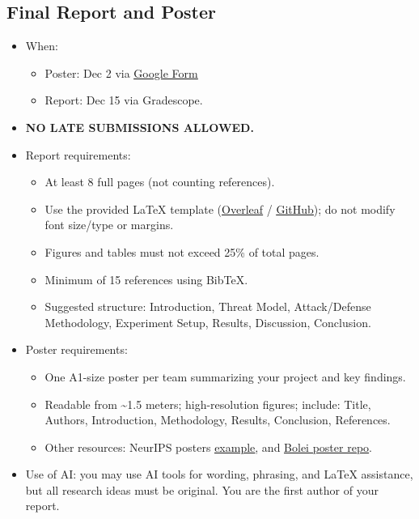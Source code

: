 \documentclass[11pt]{article}
\newcommand{\link}[2]{\href{#1}{\uline{#2}}}
\begin{document}
\subsection*{Final Report and Poster}
\begin{itemize}
  \item When:
  \begin{itemize}
    \item Poster: Dec 2 via \link{https://docs.google.com/forms/d/e/1FAIpQLScsDsRuQEsYbIouAo6meFJH_LmSatFAEXdKIDx7OClzgufe5g/viewform?usp=dialog}{Google Form}
    \item Report: Dec 15 via Gradescope.
  \end{itemize}
  \item \textbf{NO LATE SUBMISSIONS ALLOWED.}
  \item Report requirements:
  \begin{itemize}
    \item At least 8 full pages (not counting references).
    \item Use the provided LaTeX template (\link{https://www.overleaf.com/read/xmmtpvfkwbtm\#eff0e0}{Overleaf} / \link{https://github.com/ebagdasa/umass_aisec_tempate}{GitHub}); do not modify font size/type or margins.
    \item Figures and tables must not exceed 25\% of total pages.
    \item Minimum of 15 references using BibTeX.
    \item Suggested structure: Introduction, Threat Model, Attack/Defense Methodology, Experiment Setup, Results, Discussion, Conclusion.
  \end{itemize}
  \item Poster requirements:
  \begin{itemize}
    \item One A1-size poster per team summarizing your project and key findings.
    \item Readable from \textasciitilde1.5 meters; high-resolution figures; include: Title, Authors, Introduction, Methodology, Results, Conclusion, References.
    \item Other resources: NeurIPS posters \link{https://drive.google.com/drive/u/1/folders/16tSJGJryd7NgQCBblaKxTfXLZXDIJJrt}{example}, and \link{https://github.com/zhoubolei/bolei_awesome_posters}{Bolei poster repo}.
  \end{itemize}
  \item Use of AI: you may use AI tools for wording, phrasing, and LaTeX assistance, but all research ideas must be original. You are the first author of your report.
\end{itemize}
\end{document}
